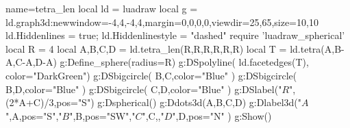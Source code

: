 \begin{luadraw}{name=tetra_len}
local ld = luadraw
local g = ld.graph3d:new{window={-4,4,-4,4},margin={0,0,0,0},viewdir={25,65},size={10,10}}
ld.Hiddenlines = true; ld.Hiddenlinestyle = "dashed"
require 'luadraw_spherical'
local R = 4
local A,B,C,D = ld.tetra_len(R,R,R,R,R,R)
local T = ld.tetra(A,B-A,C-A,D-A)
g:Define_sphere({radius=R})
g:DSpolyline( ld.facetedges(T), {color="DarkGreen"})
g:DSbigcircle( {B,C},{color="Blue"} )
g:DSbigcircle( {B,D},{color="Blue"} )
g:DSbigcircle( {C,D},{color="Blue"}  )
g:DSlabel("$R$",(2*A+C)/3,{pos="S"})
g:Dspherical()
g:Ddots3d({A,B,C,D})
g:Dlabel3d("$A$",A,{pos="S"},"$B$",B,{pos="SW"},"$C$",C,{},"$D$",D,{pos="N"} )
g:Show()
\end{luadraw}
